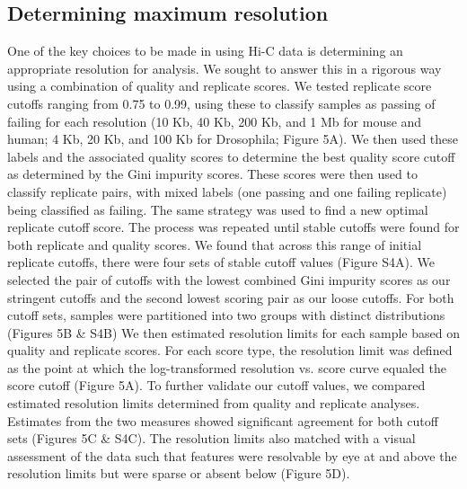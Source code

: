 
\subsection{Determining maximum resolution}

One of the key choices to be made in using Hi-C data is determining an appropriate resolution for analysis. We sought to answer this in a rigorous way using a combination of quality and replicate scores. We tested replicate score cutoffs ranging from 0.75 to 0.99, using these to classify samples as passing of failing for each resolution (10 Kb, 40 Kb, 200 Kb, and 1 Mb for mouse and human; 4 Kb, 20 Kb, and 100 Kb for Drosophila; Figure 5A). We then used these labels and the associated quality scores to determine the best quality score cutoff as determined by the Gini impurity scores. These scores were then used to classify replicate pairs, with mixed labels (one passing and one failing replicate) being classified as failing. The same strategy was used to find a new optimal replicate cutoff score. The process was repeated until stable cutoffs were found for both replicate and quality scores. We found that across this range of initial replicate cutoffs, there were four sets of stable cutoff values (Figure S4A). We selected the pair of cutoffs with the lowest combined Gini impurity scores as our stringent cutoffs and the second lowest scoring pair as our loose cutoffs. For both cutoff sets, samples were partitioned into two groups with distinct distributions (Figures 5B \& S4B) We then estimated resolution limits for each sample based on quality and replicate scores. For each score type, the resolution limit was defined as the point at which the log-transformed resolution vs. score curve equaled the score cutoff (Figure 5A). To further validate our cutoff values, we compared estimated resolution limits determined from quality and replicate analyses. Estimates from the two measures showed significant agreement for both cutoff sets (Figures 5C \& S4C). The resolution limits also matched with a visual assessment of the data such that features were resolvable by eye at and above the resolution limits but were sparse or absent below (Figure 5D).

